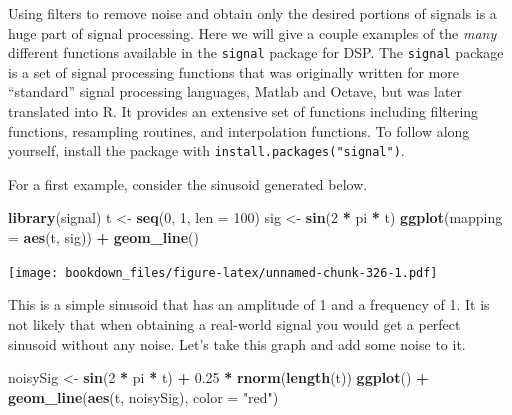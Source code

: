 \documentclass[
]{krantz}
\makeatletter
\newenvironment{Shaded}{\begin{snugshade}}{\end{snugshade}}
\newcommand{\DataTypeTok}[1]{\textcolor[rgb]{0.27,0.27,0.27}{#1}}
\newcommand{\DecValTok}[1]{\textcolor[rgb]{0.06,0.06,0.06}{#1}}
\newcommand{\FloatTok}[1]{\textcolor[rgb]{0.06,0.06,0.06}{#1}}
\newcommand{\KeywordTok}[1]{\textcolor[rgb]{0.27,0.27,0.27}{\textbf{#1}}}
\newcommand{\NormalTok}[1]{#1}
\newcommand{\OperatorTok}[1]{\textcolor[rgb]{0.43,0.43,0.43}{\textbf{#1}}}
\newcommand{\StringTok}[1]{\textcolor[rgb]{0.5,0.5,0.5}{#1}}
\newenvironment{kframe}{%
\medskip{}
\setlength{\fboxsep}{.8em}
 \def\at@end@of@kframe{}%
 \ifinner\ifhmode%
  \def\at@end@of@kframe{\end{minipage}}%
  \begin{minipage}{\columnwidth}%
 \fi\fi%
 \def\FrameCommand##1{\hskip\@totalleftmargin \hskip-\fboxsep
 \colorbox{shadecolor}{##1}\hskip-\fboxsep
     \hskip-\linewidth \hskip-\@totalleftmargin \hskip\columnwidth}%
 \MakeFramed {\advance\hsize-\width
   \@totalleftmargin\z@ \linewidth\hsize
   \@setminipage}}%
 {\par\unskip\endMakeFramed%
 \at@end@of@kframe}
\renewenvironment{Shaded}{\begin{kframe}}{\end{kframe}}
\makeatother
\begin{document}
Using filters to remove noise and obtain only the desired portions of signals is a huge part of signal processing. Here we will give a couple examples of the \emph{many} different functions available in the \texttt{signal} package for DSP. The \texttt{signal} package is a set of signal processing functions that was originally written for more ``standard'' signal processing languages, Matlab and Octave, but was later translated into R. It provides an extensive set of functions including filtering functions, resampling routines, and interpolation functions. To follow along yourself, install the package with \texttt{install.packages("signal")}.

For a first example, consider the sinusoid generated below.

\begin{Shaded}
\begin{Highlighting}[]
\KeywordTok{library}\NormalTok{(signal)}
\NormalTok{t \textless{}{-}}\StringTok{ }\KeywordTok{seq}\NormalTok{(}\DecValTok{0}\NormalTok{, }\DecValTok{1}\NormalTok{, }\DataTypeTok{len =} \DecValTok{100}\NormalTok{)}
\NormalTok{sig \textless{}{-}}\StringTok{ }\KeywordTok{sin}\NormalTok{(}\DecValTok{2} \OperatorTok{*}\StringTok{ }\NormalTok{pi }\OperatorTok{*}\StringTok{ }\NormalTok{t)}
\KeywordTok{ggplot}\NormalTok{(}\DataTypeTok{mapping =} \KeywordTok{aes}\NormalTok{(t, sig)) }\OperatorTok{+}\StringTok{ }
\StringTok{  }\KeywordTok{geom\_line}\NormalTok{()}
\end{Highlighting}
\end{Shaded}

\texttt{[image: bookdown\_files/figure-latex/unnamed-chunk-326-1.pdf]}

This is a simple sinusoid that has an amplitude of 1 and a frequency of 1. It is not likely that when obtaining a real-world signal you would get a perfect sinusoid without any noise. Let's take this graph and add some noise to it.

\begin{Shaded}
\begin{Highlighting}[]
\NormalTok{noisySig \textless{}{-}}\StringTok{ }\KeywordTok{sin}\NormalTok{(}\DecValTok{2} \OperatorTok{*}\StringTok{ }\NormalTok{pi }\OperatorTok{*}\StringTok{ }\NormalTok{t) }\OperatorTok{+}\StringTok{ }\FloatTok{0.25} \OperatorTok{*}\StringTok{ }\KeywordTok{rnorm}\NormalTok{(}\KeywordTok{length}\NormalTok{(t))}
\KeywordTok{ggplot}\NormalTok{() }\OperatorTok{+}\StringTok{ }
\StringTok{  }\KeywordTok{geom\_line}\NormalTok{(}\KeywordTok{aes}\NormalTok{(t, noisySig), }\DataTypeTok{color =} \StringTok{"red"}\NormalTok{)}
\end{Highlighting}
\end{Shaded}
\end{document}
